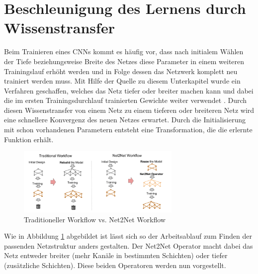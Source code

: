 \section{Beschleunigung des Lernens durch Wissenstransfer}
\label{sec:net2net}
Beim Trainieren eines CNNs kommt es häufig vor, dass nach initialem Wählen der Tiefe beziehungsweise Breite des Netzes diese Parameter in einem weiteren Trainingslauf erhöht werden und in Folge dessen das Netzwerk komplett neu trainiert werden muss. Mit Hilfe der Quelle zu diesem Unterkapitel wurde ein Verfahren geschaffen, welches das Netz tiefer oder breiter machen kann und dabei die im ersten Trainingsdurchlauf trainierten Gewichte weiter verwendet \cite{net2net}. Durch diesen Wissenstransfer von einem Netz zu einem tieferen oder breiteren Netz wird eine schnellere Konvergenz des neuen Netzes erwartet. Durch die Initialisierung mit schon vorhandenen Parametern entsteht eine Transformation, die die erlernte Funktion erhält.

\begin{figure}[h]
 \centering
 \includegraphics[width=0.7\textwidth]{KapitelPartA/images/net2net.png}
 \caption{Traditioneller Workflow vs. Net2Net Workflow}
 \label{abb:net2net}
\end{figure}


Wie in Abbildung \ref{abb:net2net} abgebildet ist lässt sich so der Arbeitsablauf zum Finden der passenden Netzstruktur anders gestalten. Der Net2Net Operator macht dabei das Netz entweder breiter (mehr Kanäle in bestimmten Schichten) oder tiefer (zusätzliche Schichten). Diese beiden Operatoren werden nun vorgestellt.

